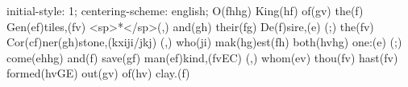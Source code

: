 initial-style: 1;
centering-scheme: english;
O(fhhg) King(hf) of(gv) the(f) Gen(ef)tiles,(fv) <sp>*</sp>(,) and(gh) their(fg) De(f)sire,(e) (;) the(fv) Cor(cf)ner(gh)stone,(kxiji/jkj) (,) who(ji) mak(hg)est(fh) both(hvhg) one:(e) (;) come(ehhg) and(f) save(gf) man(ef)kind,(fvEC) (,) whom(ev) thou(fv) hast(fv) formed(hvGE) out(gv) of(hv) clay.(f)
